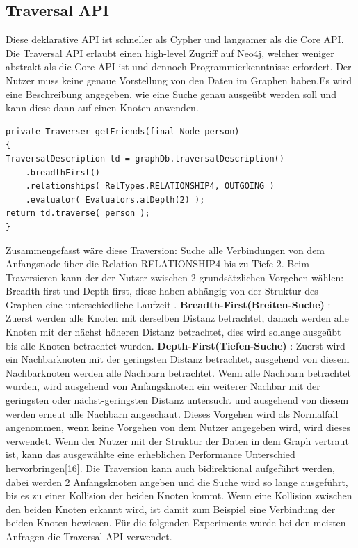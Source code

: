 \subsection{Traversal API}
Diese deklarative API ist schneller als Cypher und langsamer als die Core API. Die Traversal API erlaubt einen high-level Zugriff auf Neo4j, welcher weniger abstrakt als die Core API ist und dennoch Programmierkenntnisse erfordert. Der Nutzer muss keine genaue Vorstellung von den Daten im Graphen haben.Es wird eine Beschreibung angegeben, wie eine Suche  genau ausgeübt werden soll und kann diese dann auf einen Knoten anwenden. 
\begin{Verbatim}[frame=single]
private Traverser getFriends(final Node person)
{
TraversalDescription td = graphDb.traversalDescription()
	.breadthFirst()
	.relationships( RelTypes.RELATIONSHIP4, OUTGOING )
	.evaluator( Evaluators.atDepth(2) );
return td.traverse( person );
}
\end{Verbatim}
Zusammengefasst wäre diese Traversion: Suche alle Verbindungen von dem Anfangsnode über die Relation RELATIONSHIP4 bis zu Tiefe 2.  Beim Traversieren kann der der Nutzer zwischen 2 grundsätzlichen Vorgehen wählen: Breadth-first und Depth-first, diese haben abhängig von der Struktur des Graphen eine unterschiedliche Laufzeit \parencite{vukotic2015neo4j}. \newline
\textbf {Breadth-First(Breiten-Suche)} : Zuerst werden alle Knoten mit derselben Distanz betrachtet, danach werden alle Knoten mit der nächst höheren Distanz betrachtet, dies wird solange ausgeübt bis alle Knoten betrachtet wurden. \newline
\textbf {Depth-First(Tiefen-Suche)} : Zuerst wird ein Nachbarknoten mit der geringsten Distanz betrachtet, ausgehend von diesem Nachbarknoten werden alle Nachbarn betrachtet. Wenn alle Nachbarn betrachtet wurden, wird ausgehend von Anfangsknoten ein weiterer Nachbar mit der geringsten oder nächst-geringsten Distanz untersucht und ausgehend von diesem werden erneut alle Nachbarn angeschaut. Dieses Vorgehen wird als Normalfall angenommen, wenn keine Vorgehen von dem Nutzer angegeben wird, wird dieses verwendet. 
\newline
\newline
Wenn der Nutzer mit der Struktur der Daten in dem Graph vertraut ist, kann das ausgewählte eine erheblichen Performance Unterschied  hervorbringen[16]. Die Traversion kann auch bidirektional aufgeführt werden, dabei werden 2 Anfangsknoten angeben und die Suche wird so lange ausgeführt, bis es zu einer Kollision der beiden Knoten kommt. Wenn eine Kollision zwischen den beiden Knoten erkannt wird, ist damit zum Beispiel eine Verbindung der beiden Knoten bewiesen. Für die folgenden Experimente wurde bei den meisten Anfragen die Traversal API verwendet. 


